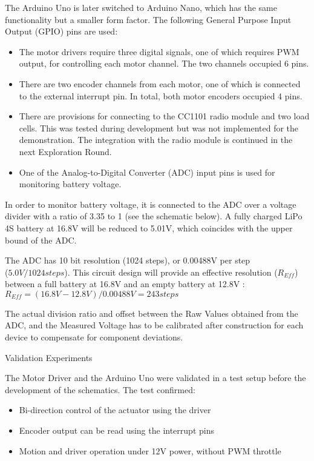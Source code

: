 The Arduino Uno is later switched to Arduino Nano, which has the same functionality but a smaller form factor. The following General Purpose Input Output (GPIO) pins are used:
\begin{itemize}
    \item The motor drivers require three digital signals, one of which requires PWM output, for controlling each motor channel. The two channels occupied 6 pins. 
    \item There are two encoder channels from each motor, one of which is connected to the external interrupt pin. In total, both motor encoders occupied 4 pins.
    \item There are provisions for connecting to the CC1101 radio module and two load cells. This was tested during development but was not implemented for the demonstration. The integration with the radio module is continued in the next Exploration Round.
    \item One of the Analog-to-Digital Converter (ADC) input pins is used for monitoring battery voltage.
\end{itemize}

In order to monitor battery voltage, it is connected to the ADC over a voltage divider with a ratio of 3.35 to 1 (see the schematic below). A fully charged LiPo 4S battery at 16.8V will be reduced to 5.01V, which coincides with the upper bound of the ADC. 

The ADC has 10 bit resolution (1024 steps), or 0.00488V per step \\($5.0V / 1024 steps$). This circuit design will provide an effective resolution ($R_{Eff}$) between a full battery at 16.8V and an empty battery at 12.8V : 
\\ $R_{Eff} = (16.8V - 12.8V) / 0.00488V = 243 steps$

The actual division ratio and offset between the Raw Values obtained from the ADC, and the Measured Voltage has to be calibrated after construction for each device to compensate for component deviations. 

Validation Experiments

The Motor Driver and the Arduino Uno were validated in a test setup before the development of the schematics. The test confirmed:
\begin{itemize}
    \item Bi-direction control of the actuator using the driver
    \item Encoder output can be read using the interrupt pins
    \item Motion and driver operation under 12V power, without PWM throttle
\end{itemize}

